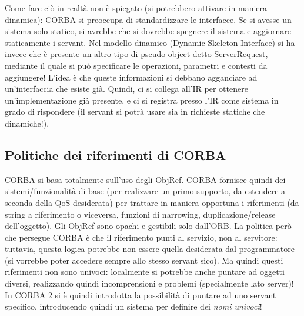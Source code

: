 Come fare ciò in realtà non è spiegato (si potrebbero attivare in maniera dinamica): CORBA si preoccupa di 
standardizzare le interfacce. Se si avesse un sistema solo statico, si avrebbe che si dovrebbe spegnere il sistema e 
aggiornare staticamente i servant.
Nel modello dinamico (Dynamic Skeleton Interface) si ha invece che è presente un altro tipo di pseudo-object detto 
ServerRequest, mediante il quale si può specificare le operazioni, parametri e contesti da aggiungere! L'idea è che 
queste informazioni si debbano agganciare ad un'interfaccia che esiste già. Quindi, ci si collega all'IR per ottenere 
un'implementazione già presente, e ci si registra presso l'IR come sistema in grado di rispondere (il servant si potrà 
usare sia in richieste statiche che dinamiche!).
\subsection{Politiche dei riferimenti di CORBA}
CORBA si basa totalmente sull'uso degli ObjRef. CORBA fornisce quindi dei sistemi/funzionalità di base (per realizzare 
un primo supporto, da estendere a seconda della QoS desiderata) per trattare in maniera opportuna i riferimenti
(da string a riferimento o viceversa, funzioni di narrowing, duplicazione/release dell'oggetto). Gli ObjRef sono opachi 
e gestibili solo dall'ORB.
La politica però che persegue CORBA è che il riferimento punti al servizio, non al servitore: tuttavia, questa logica 
potrebbe non essere quella desiderata dal programmatore (si vorrebbe poter accedere sempre allo stesso servant
sico). Ma quindi questi riferimenti non sono univoci: localmente si potrebbe anche puntare ad oggetti diversi, 
realizzando quindi incomprensioni e problemi (specialmente lato server)!
In CORBA 2 si è quindi introdotta la possibilità di puntare ad uno servant specifico, introducendo quindi un sistema per 
definire dei \textit{nomi univoci}!
